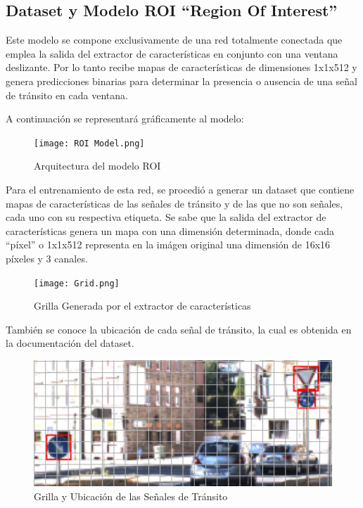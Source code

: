     \subsection{Dataset y Modelo ROI ``Region Of Interest''}
    Este modelo se compone exclusivamente de una red totalmente conectada que emplea la salida del extractor de características en conjunto con una ventana deslizante. Por lo tanto recibe mapas de características de dimensiones 1x1x512 y genera predicciones binarias para determinar la presencia o ausencia de una señal de tránsito en cada ventana.

    A continuación se representará gráficamente al modelo:
    
    \vspace{0.5cm}

    \begin{figure}[ht]
        \centering
        \texttt{[image: ROI Model.png]}
        \caption{Arquitectura del modelo ROI}
    \end{figure}

    \vspace{0.2cm}

    Para el entrenamiento de esta red, se procedió a generar un dataset que contiene mapas de características de las señales de tránsito y de las que no son señales, cada uno con su respectiva etiqueta.
    Se sabe que la salida del extractor de características genera un mapa con una dimensión determinada, donde cada ``píxel'' o 1x1x512 representa en la imágen original una dimensión de 16x16 píxeles y 3 canales.

    \pagebreak
    
    \begin{figure}[ht]
        \centering
        \texttt{[image: Grid.png]}
        \caption{Grilla Generada por el extractor de características}
    \end{figure}

    También se conoce la ubicación de cada señal de tránsito, la cual es obtenida en la documentación del dataset.

    \begin{figure}[ht]
        \centering
        \includegraphics[scale=.8]{img/Grid_label.png}
        \caption{Grilla y Ubicación de las Señales de Tránsito}
    \end{figure}


